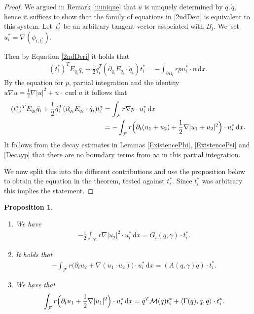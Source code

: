 \documentclass[10pt]{amsart}
\newtheorem{proposition}[theorem]{Proposition}
\theoremstyle{definition}
\DeclareMathOperator{\curl}{curl}
\newcommand\scalar[2]{\langle #1,#2\rangle}
\newcommand\eq{=}
\newcommand\dd{\,\mathrm{d}}
\newcommand\dx{\dd x}
\let\de\partial
\let\mel\relax
\begin{document}
\begin{proof}
We argued in Remark \ref{uunique} that $u$ is uniquely determined by $q,\dot{q}$, hence it suffices to show that the family of equations in \eqref{2ndDeri} is equivalent to this system. Let~$t_i^*$ be an arbitrary tangent vector associated with $B_i$. We~set $u_i^*=\nabla(\phi_{i,t_i^*})$.

Then by Equation \ref{2ndDeri} it holds that
\begin{align*}
(t_i^*)^TE_{q_i}\ddot{q}_i+\frac{1}{2}\dot{q}_i^T(\de_{q_i}E_{q_i}\cdot\dot{q}_i)t_i^*\eq -\int_{\de B_i} rpu_i^*\cdot n\dx.
\end{align*}
By the equation for $p$, partial integration and the identity $u\nabla u=\frac{1}{2}\nabla|u|^2+u\cdot \curl u$ it follows that
\begin{align*}
\mel(t_i^*)^TE_{q_i}\ddot{q}_i+\frac{1}{2}\dot{q}_i^T(\de_{q_i}E_{q_i}\cdot\dot{q}_i)t_i^*&\eq\int_{\mathcal{F}}r\nabla p\cdot u_i^*\dx\\
&\eq-\int _{\mathcal{F}}r\Bigl(\de_t(u_1+u_2)+\frac{1}{2}\nabla|u_1+u_2|^2\Bigr)\cdot u_i^*\dx.
\end{align*}
It follows from the decay estimates in Lemmas \ref{ExistencePhi}, \ref{ExistencePsi} and \ref{Decayp} that there are no boundary terms from $\infty$ in this partial integration.

We now split this into the different contributions and use the proposition below to obtain the equation in the theorem, tested against $t_i^*$. Since $t_i^*$ was arbitrary this implies the statement.\end{proof} 

\skpt
\begin{proposition}\label{Coefficients}
\begin{enumerate}
\item\label{Coefficientsa}
We have
\begin{align*}
-\frac{1}{2}\int_\mathcal{F} r\nabla|u_2|^2\cdot u_i^*\dx\eq G_i(q,\gamma)\cdot t_i^*.
\end{align*}
\item\label{Coefficientsb}
It holds that
\begin{align*}
-\int_\mathcal{F} r\bigl(\de_tu_2+\nabla(u_1\cdot u_2)\bigr)\cdot u_i^*\dx\eq (A(q,\gamma)\dot{q})\cdot t_i^*.
\end{align*}
\item\label{Coefficientsc}
We have that
\begin{align*}
\int_\mathcal{F} r\Bigl(\de_t u_1+\frac{1}{2}\nabla|u_1|^2 \Bigr)\cdot u_i^*\dx\eq \ddot{q}^T\mathcal{M}(q)t_i^*+\scalar{\Gamma(q),\dot{q}}{\dot{q}}\cdot t_i^*.
\end{align*}
\end{enumerate}
\end{proposition}
\end{document}
